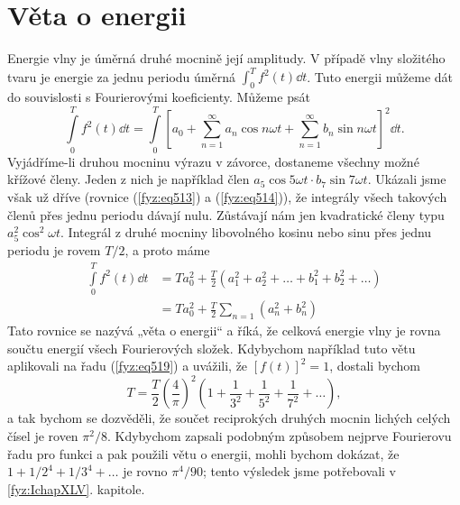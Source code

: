 \section{Věta o energii}\label{fyz:IchapLsecV}
  Energie vlny je úměrná druhé mocnině její amplitudy. V případě vlny složitého tvaru je energie za 
  jednu periodu úměrná \(\int_0^Tf^2(t)\dd{t}\). Tuto energii můžeme dát do souvislosti s 
  Fourierovými koeficienty. Můžeme psát
  \begin{equation*}
    \int\limits_0^Tf^2(t)\dd{t} = \int\limits_0^T
      \left[a_0 + \sum_{n=1}^\infty a_n\cos n\omega t +
                  \sum_{n=1}^\infty b_n\sin n\omega t
      \right]^2\dd{t}.
  \end{equation*}
  Vyjádříme-li druhou mocninu výrazu v závorce, dostaneme všechny možné křížové členy. Jeden z nich 
  je například člen \(a_5\cos5\omega t\cdot b_7\sin7\omega t\). Ukázali jsme však už dříve (rovnice 
  (\ref{fyz:eq513}) a (\ref{fyz:eq514})), že integrály všech takových členů přes jednu periodu 
  dávají nulu. Zůstávají nám jen kvadratické členy typu \(a_5^2\cos^2\omega t\). Integrál z druhé 
  mocniny libovolného kosinu nebo sinu přes jednu periodu je rovem \(T/2\), a proto máme
  \begin{align}
    \int\limits_0^Tf^2(t)\dd{t} 
      &= Ta_0^2 + \frac{T}{2}(a_1^2 + a_2^2 + \ldots + b_1^2 + b_2^2 + \ldots)   \nonumber \\
      &= Ta_0^2 + \frac{T}{2}\sum_{n=1}(a_n^2 + b_n^2)                           \label{fyz:eq521}
  \end{align}
  Tato rovnice se nazývá „věta o energii“ a říká, že celková energie vlny je rovna součtu energií 
  všech Fourierových složek. Kdybychom například tuto větu aplikovali na řadu (\ref{fyz:eq519}) a 
  uvážili, že \([f(t)]^2 = 1\), dostali bychom
  \begin{equation}\label{fyz:eq522}
    T = \frac{T}{2}\left(\dfrac{4}{\pi}\right)^2
        \left(1 + \frac{1}{3^2} + \frac{1}{5^2} + \frac{1}{7^2} + \ldots\right),
  \end{equation}
  a tak bychom se dozvěděli, že součet reciprokých druhých mocnin lichých celých čísel je roven 
  \(\pi^2/8\). Kdybychom zapsali podobným způsobem nejprve Fourierovu řadu pro funkci a pak použili 
  větu o energii, mohli bychom dokázat, že \(1 + 1/2^4 + 1/3^4 + \ldots\) je rovno \(\pi^4/90\); 
  tento výsledek jsme potřebovali v \ref{fyz:IchapXLV}. kapitole.
  
